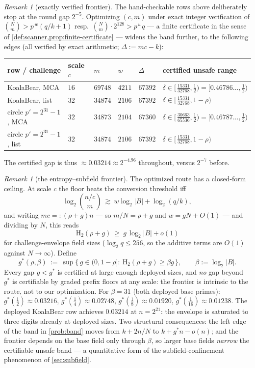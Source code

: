 \documentclass[11pt]{article}
\theoremstyle{definition}
\theoremstyle{remark}
\newtheorem{remark}[theorem]{Remark}
\newcommand{\B}{B}
\newcommand{\Hb}{\mathrm{H}_2}
\begin{document}
\begin{remark}[exactly verified frontier]\label{rem:exact-frontier}
The hand-checkable rows above deliberately stop at the round gap $2^{-5}$. Optimizing $(c,m)$ under exact integer verification of $\binom{N}{m}>p^{\,w}(q/k+1)$ resp.\ $\binom Nm\cdot2^{128}>p^{\,w}q$ --- a finite certificate in the sense of \cref{def:scanner,prop:finite-certificate} --- widens the band further, to the following edges (all verified by exact arithmetic; $\Delta:=mc-k$):
\begin{center}\footnotesize
\begin{tabular}{@{}llllll@{}}
\toprule
row / challenge & scale $c$ & $m$ & $w$ & $\Delta$ & certified unsafe range \\
\midrule
KoalaBear, MCA & $16$ & $69748$ & $4211$ & $67392$ & $\delta\in[\,\tfrac{15331}{32768},\tfrac12)=[0.46786\ldots,\tfrac12)$ \\
KoalaBear, list & $32$ & $34874$ & $2106$ & $67392$ & $\delta\in[\,\tfrac{15331}{32768},1-\rho)$ \\
circle $p'{=}2^{31}{-}1$, MCA & $32$ & $34873$ & $2104$ & $67360$ & $\delta\in[\,\tfrac{30663}{65536},\tfrac12)=[0.46787\ldots,\tfrac12)$ \\
circle $p'{=}2^{31}{-}1$, list & $32$ & $34874$ & $2106$ & $67392$ & $\delta\in[\,\tfrac{15331}{32768},1-\rho)$ \\
\bottomrule
\end{tabular}
\end{center}
The certified gap is thus $\approx0.03214\approx2^{-4.96}$ throughout, versus $2^{-7}$ before.
\end{remark}

\begin{remark}[the entropy--subfield frontier]\label{rem:entropy-frontier}
The optimized route has a closed-form ceiling. At scale $c$ the floor beats the conversion threshold iff
\[
\log_2\binom{n/c}{m}\ \gtrsim\ w\log_2|\B|+\log_2(q/k),
\]
and writing $mc=:(\rho+g)n$ --- so $m/N=\rho+g$ and $w=gN+O(1)$ --- and dividing by $N$, this reads
\[
\Hb(\rho+g)\ \ge\ g\,\log_2|\B|+o(1)
\]
for challenge-envelope field sizes ($\log_2q\le256$, so the additive terms are $O(1)$ against $N\to\infty$). Define
\[
g^*(\rho,\beta)\ :=\ \sup\bigl\{\,g\in(0,1-\rho]:\ \Hb(\rho+g)\ge\beta g\,\bigr\},
\qquad
\beta:=\log_2|\B| .
\]
Every gap $g<g^*$ is certified at large enough deployed sizes, and \emph{no} gap beyond $g^*$ is certifiable by graded prefix floors at any scale: the frontier is intrinsic to the route, not to our optimization. For $\beta=31$ (both deployed base primes): $g^*(\tfrac12)\approx0.03216$, $g^*(\tfrac14)\approx0.02748$, $g^*(\tfrac18)\approx0.01920$, $g^*(\tfrac1{16})\approx0.01238$. The deployed KoalaBear row achieves $0.03214$ at $n=2^{21}$: the envelope is saturated to three digits already at deployed sizes. Two structural consequences: the left edge of the band in \cref{prob:band} moves from $k+2n/N$ to $k+g^*n-o(n)$; and the frontier depends on the base field only through $\beta$, so larger base fields \emph{narrow} the certifiable unsafe band --- a quantitative form of the subfield-confinement phenomenon of \cref{sec:subfield}.
\end{remark}
\end{document}
